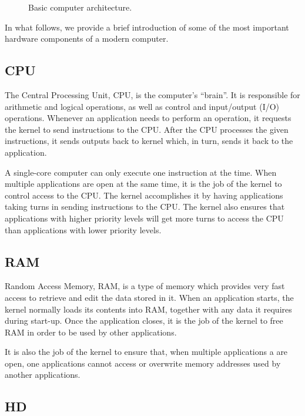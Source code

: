 \begin{figure}[!htbp]
  \centering
        
        \caption{Basic computer architecture.}
        \label{fig:cha_kernel}
\end{figure}

In what follows, we provide a brief introduction of some of the most important hardware components of a modern computer.

\subsection{CPU}
The Central Processing Unit, \acs{CPU}, is the computer's ``brain''. It is responsible for arithmetic and logical operations, as well as control and input/output (I/O) operations. Whenever an application needs to perform an operation, it requests the kernel to send instructions to the \acs{CPU}. After the \acs{CPU} processes the given instructions, it sends outputs back to kernel which, in turn, sends it back to the application.

A single-core computer can only execute one instruction at the time. When multiple applications are open at the same time, it is the job of the kernel to control access to the \acs{CPU}. The kernel accomplishes it by having applications taking turns in sending instructions to the \acs{CPU}. The kernel also ensures that applications with higher priority levels will get more turns to access the \acs{CPU} than applications with lower priority levels.

\subsection{RAM}

Random Access Memory, \acs{RAM}, is a type of memory which provides very fast access to retrieve and edit the data stored in it. When an application starts, the kernel normally loads its contents into \acs{RAM}, together with any data it requires during start-up. Once the application closes, it is the job of the kernel to free \acs{RAM} in order to be used by other applications.

It is also the job of the kernel to ensure that, when multiple applications a are open, one applications cannot access or overwrite memory addresses used by another applications.

\subsection{HD}

